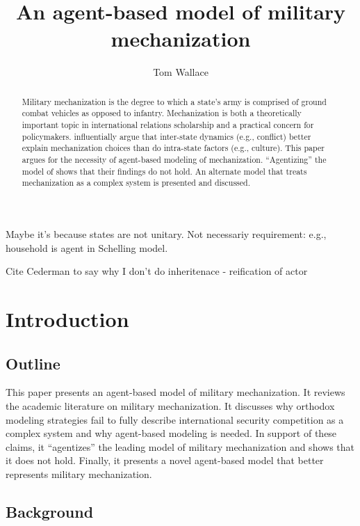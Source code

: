 \documentclass{article}
\title{An agent-based model of military mechanization}
\author{Tom Wallace}
\begin{document}
\maketitle

\begin{abstract}

	Military mechanization is the degree to which a state's army is comprised of
	ground combat vehicles as opposed to infantry. Mechanization is both a 
	theoretically important topic in international relations scholarship and a practical 
	concern for policymakers. \citet{sechser2010army} influentially argue that
	inter-state dynamics (e.g., conflict) better explain mechanization choices than do
	intra-state factors (e.g., culture). This paper argues for the
	necessity of agent-based modeling of mechanization. ``Agentizing'' the
	model of \citet{sechser2010army} shows that their findings do not hold.
	An alternate model that treats mechanization as a complex system is presented 
	and discussed.

\end{abstract}

\newpage


Maybe it's because states are not unitary. Not necessariy requirement: e.g.,
household is agent in Schelling model. 

Cite Cederman to say why I don't do inheritenace - reification of actor

\section{Introduction}

\subsection{Outline}

This paper presents an agent-based model of military mechanization. It
reviews the academic literature on military mechanization. It discusses why
orthodox modeling strategies fail to fully describe international security competition
as a complex system and why agent-based modeling is needed. In support of these
claims, it ``agentizes'' the leading model of military mechanization and shows
that it does not hold. Finally, it presents a
novel agent-based model that better represents military mechanization. 

\subsection{Background}
\end{document}
